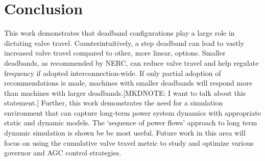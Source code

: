 \section{Conclusion}
This work demonstrates that deadband configurations play a large role in dictating valve travel.
Counterintuitively, a step deadband can lead to vastly increased valve travel compared to other, more linear, options.
Smaller deadbands, as recommended by NERC, can reduce valve travel and help regulate frequency if adopted interconnection-wide.
If only partial adoption of recommendations is made, machines with smaller deadbands will respond more than machines with larger deadbands.[MKDNOTE: I want to talk about this statement.]
Further, this work demonstrates the need for a simulation environment that can capture long-term power system dynamics with appropriate static and dynamic models. The `sequence of power flows' approach to long term dynamic simulation is shown be be most useful. Future work in this area will focus on using the cumulative valve travel metric to study and optimize various governor and AGC control strategies.

